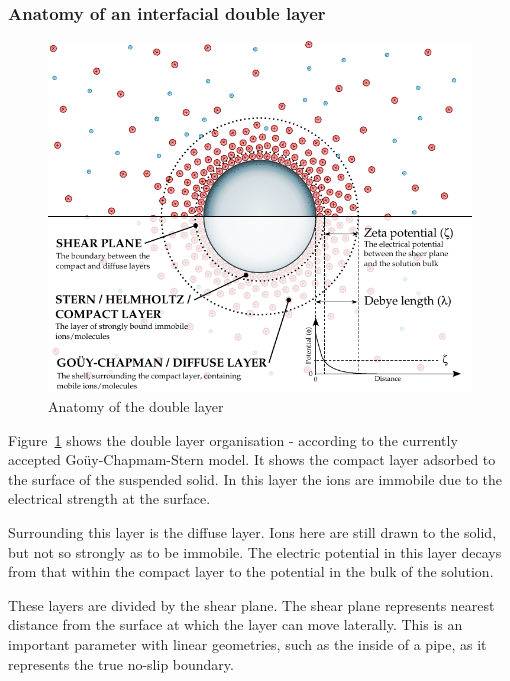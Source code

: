   \subsubsection*{Anatomy of an interfacial double layer}

    \begin{figure}
      \begin{center}
        \includegraphics{content/introduction/graphics/doubleLayer_version2}
      \end{center}
      \caption{Anatomy of the double layer}
      \label{fig:doubleLayer_anatomy}
    \end{figure}

    Figure~\ref{fig:doubleLayer_anatomy} shows the double layer organisation - according to the currently accepted Goüy-Chapmam-Stern model.
    It shows the compact layer adsorbed to the surface of the suspended solid.
    In this layer the ions are immobile due to the electrical strength at the surface.
    
    Surrounding this layer is the diffuse layer.
    Ions here are still drawn to the solid, but not so strongly as to be immobile.
    The electric potential in this layer decays from that within the compact layer to the potential in the bulk of the solution.

    These layers are divided by the shear plane.
    The shear plane represents nearest distance from the surface at which the layer can move laterally.
    This is an important parameter with linear geometries, such as the inside of a pipe, as it represents the true no-slip boundary.

